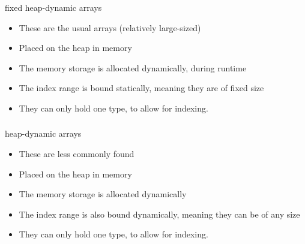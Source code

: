 \subsubsection{}
fixed heap-dynamic arrays

\begin{itemize}[noitemsep]
\item These are the usual arrays (relatively large-sized)
\item Placed on the heap in memory
\item The memory storage is allocated dynamically, during runtime
\item The index range is bound statically, meaning they are of fixed size
\item They can only hold one type, to allow for indexing.
\end{itemize}

\subsubsection{}
heap-dynamic arrays

\begin{itemize}[noitemsep]
\item These are less commonly found
\item Placed on the heap in memory
\item The memory storage is allocated dynamically
\item The index range is also bound dynamically, meaning they can be of any size
\item They can only hold one type, to allow for indexing.
\end{itemize}

